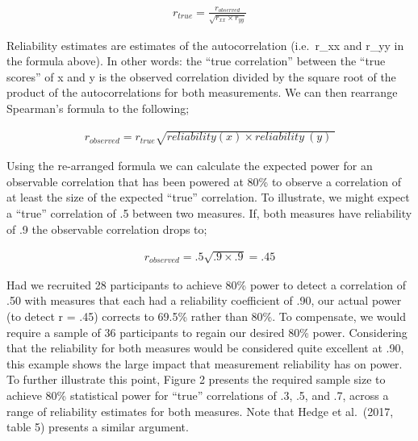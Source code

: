 \documentclass[english,,man,floatsintext]{apa6}
\begin{document}
\begin{align}
r_{true}=\frac{r_{observed}}{\sqrt{r_{xx} \times r_{yy}}}
\end{align}

Reliability estimates are estimates of the autocorrelation (i.e.~r\_xx and r\_yy in the formula above). In other words: the \enquote{true correlation} between the \enquote{true scores} of x and y is the observed correlation divided by the square root of the product of the autocorrelations for both measurements. We can then rearrange Spearman's formula to the following;

\begin{align}
r_{observed}=r_{true} \sqrt{reliability(x) \times reliability ~(y) ~}
\end{align}

Using the re-arranged formula we can calculate the expected power for an observable correlation that has been powered at 80\% to observe a correlation of at least the size of the expected \enquote{true} correlation. To illustrate, we might expect a \enquote{true} correlation of .5 between two measures. If, both measures have reliability of .9 the observable correlation drops to;

\begin{align}
r_{observed}=.5 \sqrt{.9 \times .9}=.45
\end{align}

Had we recruited 28 participants to achieve 80\% power to detect a correlation of .50 with measures that each had a reliability coefficient of .90, our actual power (to detect r = .45) corrects to 69.5\% rather than 80\%. To compensate, we would require a sample of 36 participants to regain our desired 80\% power. Considering that the reliability for both measures would be considered quite excellent at .90, this example shows the large impact that measurement reliability has on power. To further illustrate this point, Figure 2 presents the required sample size to achieve 80\% statistical power for \enquote{true} correlations of .3, .5, and .7, across a range of reliability estimates for both measures. Note that Hedge et al.~(2017, table 5) presents a similar argument.
\end{document}
